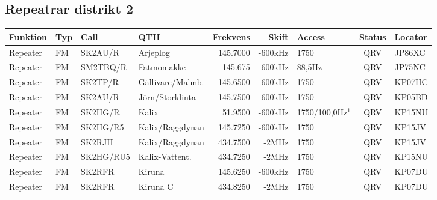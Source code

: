 \begin{landscape}
\subsection{Repeatrar distrikt 2}
\footnotesize
\begin{longtable}{llllrrlcl}
	\textbf{Funktion}         & \textbf{Typ}  & \textbf{Call} & \textbf{QTH}        & \textbf{Frekvens} & \textbf{Skift} & \textbf{Access}  & \textbf{Status} & \textbf{Locator} \\ \hline
	\endhead
	Repeater                  & FM            & SK2AU/R       & Arjeplog            & 145.7000          & -600kHz        & 1750             & QRV             & JP86XC           \\
	Repeater                  & FM            & SM2TBQ/R      & Fatmomakke          & 145.675           & -600kHz        & 88,5Hz           & QRV             & JP75NC           \\
	Repeater                  & FM            & SK2TP/R       & Gällivare/Malmb.    & 145.6500          & -600kHz        & 1750             & QRV             & KP07HC           \\
	Repeater                  & FM            & SK2AU/R       & Jörn/Storklinta     & 145.7500          & -600kHz        & 1750             & QRV             & KP05BD           \\
	Repeater                  & FM            & SK2HG/R       & Kalix               & 51.9500           & -600kHz        & 1750/100,0Hz$^1$ & QRV             & KP15NU           \\
	Repeater                  & FM            & SK2HG/R5      & Kalix/Raggdynan     & 145.7250          & -600kHz        & 1750             & QRV             & KP15JV           \\
	Repeater                  & FM            & SK2RJH        & Kalix/Raggdynan     & 434.7500          & -2MHz          & 1750             & QRV             & KP15JV           \\
	Repeater                  & FM            & SK2HG/RU5     & Kalix-Vattent.      & 434.7250          & -2MHz          & 1750             & QRV             & KP15NU           \\
	Repeater                  & FM            & SK2RFR        & Kiruna              & 145.6250          & -600kHz        & 1750             & QRV             & KP07DU           \\
	Repeater                  & FM            & SK2RFR        & Kiruna C            & 434.8250          & -2MHz          & 1750             & QRV             & KP07DU           \\

\end{longtable}
\end{landscape}
